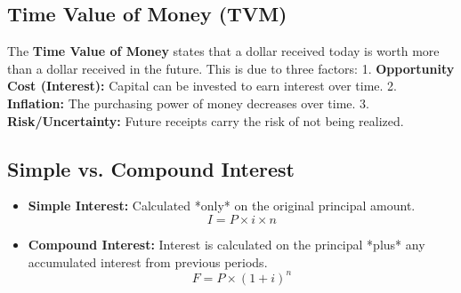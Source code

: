 \documentclass[12pt,a4paper]{article}
\begin{document}
\begin{tcolorbox}[tikzbox, title={Typical Cash Flow Diagram for an Engineering Project}]
\centering
{}
\end{tcolorbox}

\subsection{Time Value of Money (TVM)}
The \textbf{Time Value of Money} states that a dollar received today is worth more than a dollar received in the future. This is due to three factors:
1.  \textbf{Opportunity Cost (Interest):} Capital can be invested to earn interest over time.
2.  \textbf{Inflation:} The purchasing power of money decreases over time.
3.  \textbf{Risk/Uncertainty:} Future receipts carry the risk of not being realized.

\subsection{Simple vs. Compound Interest}
\begin{itemize}[leftmargin=*, itemsep=6pt]
  \item \textbf{Simple Interest:} Calculated *only* on the original principal amount.
    \begin{equation}
      I = P \times i \times n
    \end{equation}
  \item \textbf{Compound Interest:} Interest is calculated on the principal *plus* any accumulated interest from previous periods.
    \begin{equation}
      F = P \times (1 + i)^n
    \end{equation}
\end{itemize}
\end{document}
